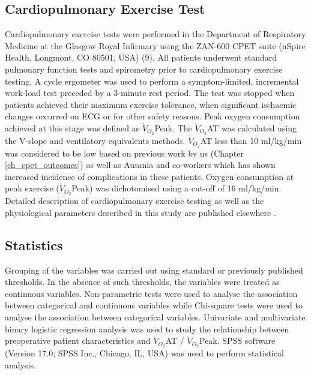 \subsection{Cardiopulmonary Exercise Test}
Cardiopulmonary exercise tests were performed in the Department of Respiratory Medicine at the Glasgow Royal Infirmary using the ZAN-600 CPET suite (nSpire Health, Longmont, CO 80501, USA) (9). 
All patients underwent standard pulmonary function tests and spirometry prior to cardiopulmonary exercise testing. 
A cycle ergometer was used to perform a symptom-limited, incremental work-load test preceded by a 3-minute rest period. 
The test was stopped when patients achieved their maximum exercise tolerance, when significant ischaemic changes occurred on ECG or for other safety reasons. 
Peak oxygen consumption achieved at this stage was defined as $\dot{V}_{O_2}$Peak. 
The $\dot{V}_{O_2}$AT was calculated using the V-slope \parencite{beaver_new_1986,sue_metabolic_1988} and ventilatory equivalents \parencite{society_ats/accp_2003} methods. $\dot{V}_{O_2}$AT less than 10 ml/kg/min was considered to be low based on previous work by us (Chapter \ref{ch_cpet_outcomes}) as well as Ausania and co-workers \parencite{ausania_effects_2012} which has shown increased incidence of complications in these patients. 
Oxygen consumption at peak exercise ($\dot{V}_{O_2}$Peak) was dichotomised using a cut-off of 16 ml/kg/min. 
Detailed description of cardiopulmonary exercise testing as well as the physiological parameters described in this study are published elsewhere \parencite{balady_clinicians_2010}.

\subsection{Statistics}
Grouping of the variables was carried out using standard or previously published thresholds. 
In the absence of such thresholds, the variables were treated as continuous variables. 
Non-parametric tests were used to analyse the association between categorical and continuous variables while Chi-square tests were used to analyse the association between categorical variables. 
Univariate and multivariate binary logistic regression analysis was used to study the relationship between preoperative patient characteristics and $\dot{V}_{O_2}$AT / $\dot{V}_{O_2}$Peak. 
SPSS software (Version 17.0; SPSS Inc., Chicago, IL, USA) was used to perform statistical analysis.

\clearpage

